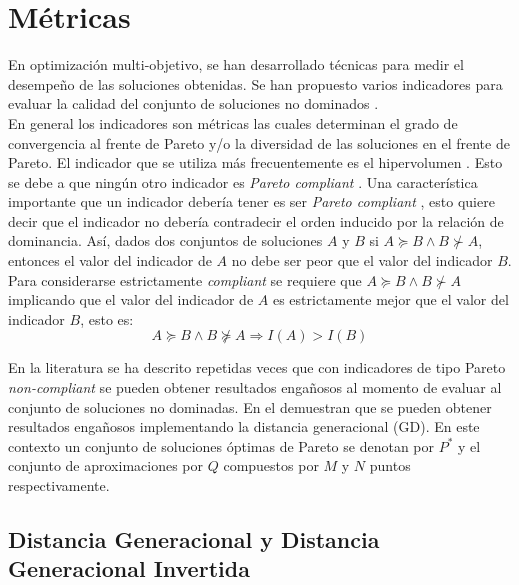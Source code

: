 \section{Métricas}
En optimización multi-objetivo, se han desarrollado técnicas para medir el desempeño de las soluciones obtenidas.
%
Se han propuesto varios indicadores para evaluar la calidad del conjunto de soluciones no dominados \citep{Joel:EjemploFallaGD}.\\
%
En general los indicadores son métricas las cuales determinan el grado de convergencia al frente de Pareto y/o la diversidad de las soluciones en el frente de Pareto.
%
El indicador que se utiliza más frecuentemente es el hipervolumen \citep{Joel:ComparativeCaseStudy} . 
%
Esto se debe a que ningún otro indicador es \textit{Pareto compliant} \citep{Joel:HypervolumeRevisited}. 
%
Una característica importante que un indicador debería tener es ser \textit{Pareto compliant} \citep{Joel:ComparacionMetricas}, esto quiere decir que el indicador no debería contradecir el orden inducido por la relación de dominancia.
%
Así, dados dos conjuntos de soluciones $A$ y $B$ si $A \succeq B \land B \nsucc A$, entonces el valor del indicador de $A$ no debe ser peor que el valor del indicador $B$.
%
Para considerarse estrictamente \textit{compliant} se requiere que $A \succeq B \land B  \nsucc A$ implicando que el valor del indicador de $A$ es estrictamente mejor que el valor del indicador $B$, esto es:
\begin{equation*}
   A \succeq B \land B \nsucceq A \Rightarrow  I(A) > I(B)
\end{equation*}
%

%
En la literatura se ha descrito repetidas veces \citep{Joel:HypervolumeRevisited, Joel:EjemploFallaGD}  que con indicadores de tipo Pareto \textit{non-compliant} se pueden obtener resultados engañosos al momento de evaluar al conjunto de soluciones no dominadas. 
%
En el \citeyear{Joel:EjemploFallaGD} \citeauthor{Joel:EjemploFallaGD} demuestran que se pueden obtener resultados engañosos implementando la distancia generacional (GD).
%
En este contexto un conjunto de soluciones óptimas de Pareto se denotan por $P^*$ y el conjunto de aproximaciones por $Q$ compuestos por $M$ y $N$ puntos respectivamente.

\subsection{Distancia Generacional y Distancia Generacional Invertida}

